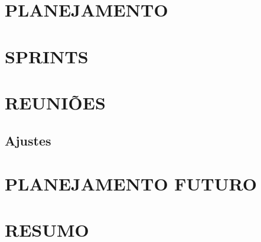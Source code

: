 

\part{PLANEJAMENTO}



% 





%



%

%




\part{SPRINTS}

%

%

%


\part{REUNIÕES}
\label{parte-reuniao}


%

%

%	

\chapter{Ajustes}

	


\part{PLANEJAMENTO FUTURO}







\part{RESUMO}




% 

